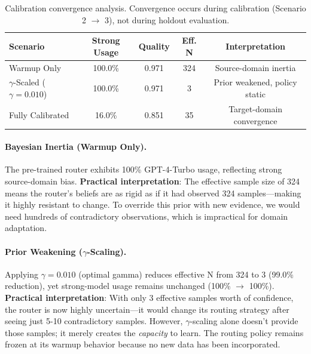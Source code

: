 \begin{table}[t]
\centering
\caption{Calibration convergence analysis. Convergence occurs during calibration (Scenario 2 $\rightarrow$ 3), not during holdout evaluation.}
\label{tab:calibration-convergence}
\begin{tabular}{lcccc}
\toprule
\textbf{Scenario} & \textbf{Strong Usage} & \textbf{Quality} & \textbf{Eff. N} & \textbf{Interpretation} \\
\midrule
Warmup Only & 100.0\% & 0.971 & 324 & Source-domain inertia \\
$\gamma$-Scaled ($\gamma=0.010$) & 100.0\% & 0.971 & 3 & Prior weakened, policy static \\
Fully Calibrated & 16.0\% & 0.851 & 35 & Target-domain convergence \\
\bottomrule
\end{tabular}
\end{table}

\paragraph{Bayesian Inertia (Warmup Only).} The pre-trained router exhibits 100\% GPT-4-Turbo usage, reflecting strong source-domain bias. \textbf{Practical interpretation}: The effective sample size of 324 means the router's beliefs are as rigid as if it had observed 324 samples—making it highly resistant to change. To override this prior with new evidence, we would need hundreds of contradictory observations, which is impractical for domain adaptation.

\paragraph{Prior Weakening ($\gamma$-Scaling).} Applying $\gamma=0.010$ (optimal gamma) reduces effective N from 324 to 3 (99.0\% reduction), yet strong-model usage remains unchanged (100\% $\rightarrow$ 100\%). \textbf{Practical interpretation}: With only 3 effective samples worth of confidence, the router is now highly uncertain—it would change its routing strategy after seeing just 5-10 contradictory samples. However, $\gamma$-scaling alone doesn't provide those samples; it merely creates the \emph{capacity} to learn. The routing policy remains frozen at its warmup behavior because no new data has been incorporated.


